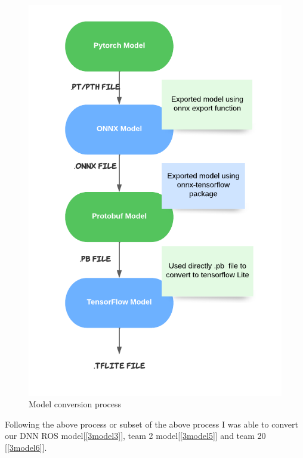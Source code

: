 \begin{figure}[H]
\centering
\includegraphics[scale=0.8]{img/model_conversion_process.png}
\caption{Model conversion process}
\label{fig:model_conversion_process}
\end{figure}


Following the above process or subset of the above process I was able to convert our DNN ROS model[\ref{3model3}], team 2 model[\ref{3model5}] and team 20 [\ref{3model6}]. 

































